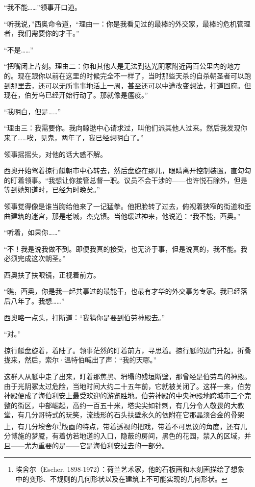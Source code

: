 \documentclass[AutoFakeBold=true]{book}
\begin{document}
``我不能……''领事开口道。

``听我说，''西奥命令道，``理由一：你是我看见过的最棒的外交家，最棒的危机管理者，我们需要你的才干。''

``不是……''

``把嘴闭上片刻。理由二：你和其他人是无法到达光阴冢附近两百公里内的地方的。现在跟你以前在这里的时候完全不一样了，当时那些天杀的自杀朝圣者可以跑到那里去，还可以无所事事地活上一周，甚至还可以中途改变想法，打道回府。但现在，伯劳鸟已经开始行动了。那就像是瘟疫。''

``我明白，但是……''

``理由三：我需要你。我向鲸逖中心请求过，叫他们派其他人过来。然后我发现你来了……唉，见鬼，两年了，我已经想明白了。''

领事摇摇头，对他的话大惑不解。

西奥开始驾着掠行艇朝市中心转去，然后盘旋在那儿，眼睛离开控制装置，直勾勾的盯着领事。``我想让你接管总督一职。议员不会干涉的——也许悦石除外，但是等到她知道时，已经为时晚矣。''

领事觉得像是谁当胸给他来了一记猛拳。他把脸转了过去，俯视着狭窄的街道和歪曲建筑的迷宫，那是老城，杰克镇。当他缓过神来，他说道：``我不能，西奥。''

``听着，如果你……''

``不！我是说我做不到。即便我真的接受，也无济于事，但是说真的，我不能。我必须完成这次朝圣。''

西奥扶了扶眼镜，正视着前方。

``瞧，西奥，你是我一起共事过的最能干，也最有才华的外交事务专家。我已经落后八年了。我想……''

西奥略一点头，打断道：``我猜你是要到伯劳神殿去。''

``对。''

掠行艇盘旋着，着陆了。领事茫然的盯着前方，寻思着。掠行艇的边门升起，折叠拢来，然后，索尔·温特伯喊出了声：``我的天哪。''

这群人从艇中走了出来，盯着那焦黑、坍塌的残垣断壁，那曾经是伯劳鸟的神殿。由于光阴冢太过危险，当地时间大约二十五年前，它就被关闭了。这样一来，伯劳神殿便成了海伯利安上最受欢迎的游览胜地。伯劳神殿的中央神殿地跨城市三个完整的街区，中部崛起，高约一百五十米，塔尖尖如针刺，有几分令人敬畏的大教堂，有几分哥特式的玩笑，流线形的石头扶壁永久的依附在它那晶须合金的骨架上，有几分埃舍尔\footnote{埃舍尔（Escher, 1898-1972）：荷兰艺术家，他的石板画和木刻画描绘了想象中的变形、不规则的几何形状以及在建筑上不可能实现的几何形状。}版画的特点，带着透视的把戏，带着不可思议的角度，还有几分博施的梦魇，有着仿若地道的入口，隐蔽的房间，黑色的花园，禁入的区域，并且——尤为重要的是——它是海伯利安过去的一部分。
\end{document}
